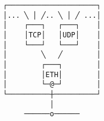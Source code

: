 \documentclass[varwidth,crop]{standalone}
\begin{document}
\begin{verbatim}
┌─────────────────────┐
│... ╲ │ ╱.. ╲ │ ╱ ...│
│    ┌───┐   ┌───┐    │
│    │TCP│   │UDP│    │
│    └───┘   └───┘    │
│        ╲   ╱        │
│        ┌───┐        │
│        │ETH│        │
│        └─@─┘        │
└──────────┼──────────┘
           │
     ──────o────── 
\end{verbatim}
\end{document}
